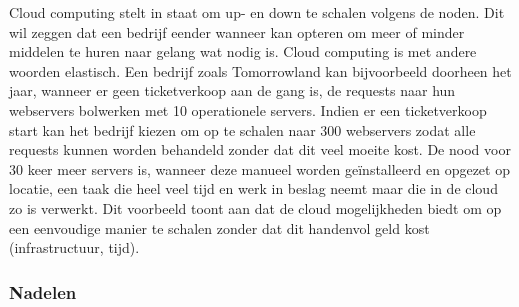 \begin{description}[style=unboxed, labelwidth=\linewidth, listparindent =0pt]
    \item [Schaalbaarheid en flexibiliteit]
    Cloud computing stelt in staat om up- en down te schalen volgens de noden. Dit wil zeggen dat een bedrijf eender wanneer kan opteren om meer of minder middelen te huren naar gelang wat nodig is. Cloud computing is met andere woorden elastisch. Een bedrijf zoals Tomorrowland kan bijvoorbeeld doorheen het jaar, wanneer er geen ticketverkoop aan de gang is, de requests naar hun webservers bolwerken met 10 operationele servers. Indien er een ticketverkoop start kan het bedrijf kiezen om op te schalen naar 300 webservers zodat alle requests kunnen worden behandeld zonder dat dit veel moeite kost. De nood voor 30 keer meer servers is, wanneer deze manueel worden geïnstalleerd en opgezet op locatie, een taak die heel veel tijd en werk in beslag neemt maar die in de cloud zo is verwerkt. Dit voorbeeld toont aan dat de cloud mogelijkheden biedt om op een eenvoudige manier te schalen zonder dat dit handenvol geld kost (infrastructuur, tijd).
    \newline
  
\end{description}

\subsubsection{Nadelen}


